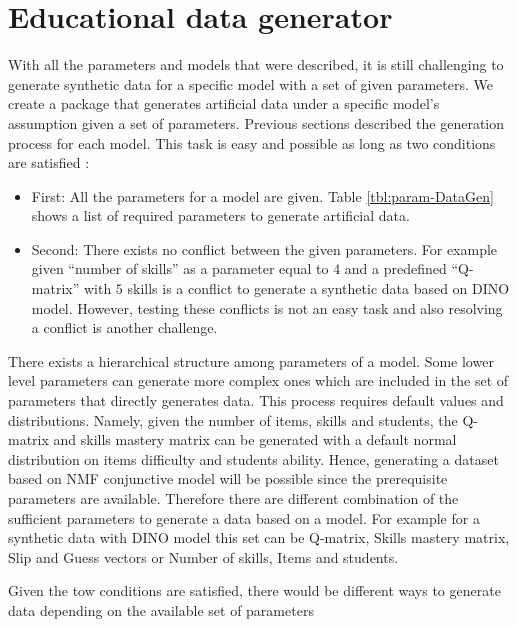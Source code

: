\section{Educational data generator}

With all the parameters and models that were described, it is still challenging to generate synthetic data for a specific model with a set of given parameters. We \citep{Trieu2015} create a package that generates artificial data under a specific model's assumption given a set of parameters. Previous sections described the generation process for each model. This task is easy and possible as long as two conditions are satisfied : 
\begin{itemize}
\item First: All the parameters for a model are given. Table \ref{tbl:param-DataGen} shows a list of required parameters to generate artificial data.
\item Second: There exists no conflict between the given parameters. For example given ``number of skills'' as a parameter equal to $4$ and a predefined ``Q-matrix'' with $5$ skills is a conflict to generate a synthetic data based on DINO model. However, testing these conflicts is not an easy task and also resolving a conflict is another challenge.
\end{itemize} 

There exists a hierarchical structure among parameters of a model. Some lower level parameters can generate more complex ones which are included in the set of parameters that directly generates data. This process requires default values and distributions. Namely, given the number of items, skills and students, the Q-matrix and skills mastery matrix can be generated with a default normal distribution on items difficulty and students ability. Hence,  generating a dataset based on NMF conjunctive model will be possible since the prerequisite parameters are available. Therefore there are different combination of the sufficient parameters to generate a data based on a model. For example for a synthetic data with DINO model this set can be {Q-matrix, Skills mastery matrix, Slip and Guess vectors} or {Number of skills, Items and students}.

Given the tow conditions are satisfied, there would be different ways to generate data depending on the available set of parameters

